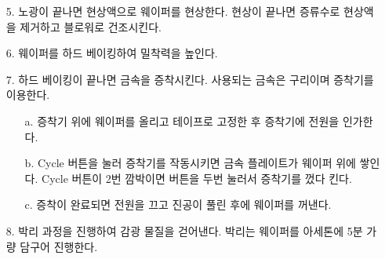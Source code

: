 \documentclass[aps,reprint,superscriptaddress,10pt]{revtex4-2}
\begin{document}
\begin{itemize}
  \item[5. ]
  노광이 끝나면 현상액으로 웨이퍼를 현상한다. 현상이 끝나면 증류수로 현상액을 제거하고 블로워로
  건조시킨다.
  \item[6. ]
  웨이퍼를 하드 베이킹하여 밀착력을 높인다.
  \item[7. ]
  하드 베이킹이 끝나면 금속을 증착시킨다. 사용되는 금속은 구리이며 증착기를 이용한다.
  \begin{itemize}
    \item[a. ]
    증착기 위에 웨이퍼를 올리고 테이프로 고정한 후 증착기에 전원을 인가한다.
    \item[b. ]
    Cycle 버튼을 눌러 증착기를 작동시키면 금속 플레이트가 웨이퍼 위에 쌓인다. 
    Cycle 버튼이 2번 깜박이면 버튼을 두번 눌러서 증착기를 껐다 킨다. 
    \item[c. ]
    증착이 완료되면 전원을 끄고 진공이 풀린 후에 웨이퍼를 꺼낸다.
  \end{itemize}
  \item[8. ]
  박리 과정을 진행하여 감광 물질을 걷어낸다. 박리는 웨이퍼를 아세톤에 5분 가량 담구어 진행한다.
\end{itemize}

\nocite{*} 





\vfill
\end{document}
